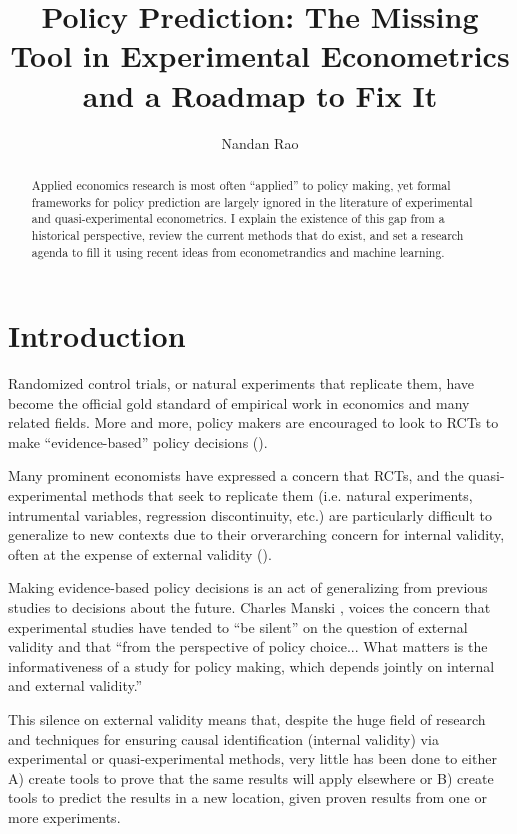 \documentclass[a4paper,12pt]{article}
\title{ Policy Prediction: The Missing Tool in Experimental Econometrics and a Roadmap to Fix It  }
\author{Nandan Rao}
\begin{document}
\maketitle

\begin{abstract}
Applied economics research is most often ``applied'' to policy making, yet formal frameworks for policy prediction are largely ignored in the literature of experimental and quasi-experimental econometrics. I explain the existence of this gap from a historical perspective, review the current methods that do exist, and set a research agenda to fill it using recent ideas from econometrandics and machine learning. 
\end{abstract}


\section{Introduction}

Randomized control trials, or natural experiments that replicate them, have become the official gold standard of empirical work in economics and many related fields. More and more, policy makers are encouraged to look to RCTs to make ``evidence-based'' policy decisions (\cite{Manski2013, Cartwright2013}). 

Many prominent economists have expressed a concern that RCTs, and the quasi-experimental methods that seek to replicate them (i.e. natural experiments, intrumental variables, regression discontinuity, etc.) are particularly difficult to generalize to new contexts due to their orverarching concern for internal validity, often at the expense of external validity (\cite{Heckman1995, Heckman2008, Deaton2010, Manski2013, Deaton2018}). 

Making evidence-based policy decisions is an act of generalizing from previous studies to decisions about the future. Charles Manski \parencite*{Manski2013}, voices the concern that experimental studies have tended to ``be silent'' on the question of external validity and that ``from the perspective of policy choice... What matters is the informativeness of a study for policy making, which depends jointly on internal and external validity.''

This silence on external validity means that, despite the huge field of research and techniques for ensuring causal identification (internal validity) via experimental or quasi-experimental methods, very little has been done to either A) create tools to prove that the same results will apply elsewhere or B) create tools to predict the results in a new location, given proven results from one or more experiments. 
\end{document}
